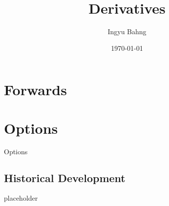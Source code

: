 \documentclass[10pt]{article}
\title{Derivatives}
\date{\today}
\author{Ingyu Bahng}
\begin{document}


\section{Forwards}


\section{Options}

  \begin{core}{Options}



  \end{core}

  \subsection{Historical Development}

    \begin{core}{placeholder}





    \end{core}
\end{document}
